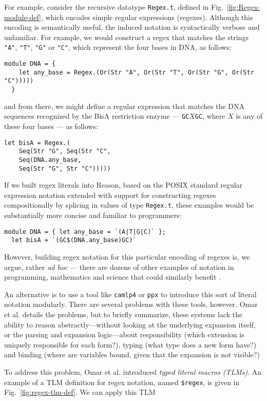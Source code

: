 \documentclass[acmsmall,review]{acmart}
\newcommand{\li}[1]{\lstinline[basicstyle=\ttfamily\fontsize{9pt}{1em}\selectfont]{#1}}
\theoremstyle{slplain}
\numberwithin{thm}{section}
\begin{document}
For example, consider the recursive datatype \li{Regex.t}, defined in Fig.~\ref{fig:Regex-module-def}, which encodes simple regular expressions (regexes). Although this encoding is semantically useful, the induced notation is syntactically verbose and unfamiliar. For example, we would construct a regex that matches the strings \li{"A"}, \li{"T"}, \li{"G"} or \li{"C"}, which represent the four bases in DNA, as follows:
\begin{lstlisting}[numbers=none]
  module DNA = { 
    let any_base = Regex.(Or(Str "A", Or(Str "T", Or(Str "G", Or(Str "C")))))
  }
\end{lstlisting}
and from there, we might define a regular expression that matches the DNA sequences recognized by the BisA restriction enzyme --- \li{GC}$X$\li{GC}, where $X$ is any of these four bases --- as follows:
\begin{lstlisting}[numbers=none]
  let bisA = Regex.(
    Seq(Str "G", Seq(Str "C", 
    Seq(DNA.any_base, 
    Seq(Str "G", Str "C")))))
\end{lstlisting}

If we built regex literals into Reason, based on the POSIX standard regular expression notation extended with support for constructing regexes compositionally by splicing in values of type \li{Regex.t}, these examples would be substantially more concise and familiar to programmers:
\begin{lstlisting}[numbers=none]
  module DNA = { let any_base = `(A|T|G|C)` };
  let bisA = `(GC$(DNA.any_base)GC)`
\end{lstlisting}

However, building regex notation for this particular encoding of regexes is, we argue, rather \emph{ad hoc} --- there are dozens of other examples of notation in programming, mathematics and science that could similarly benefit \cite{cites,from,paper}. 

An alternative is to use a tool like \li{camlp4} or \li{ppx} to introduce this sort of literal notation modularly. There are several problems with these tools, however. Omar et al. \cite{TLMs-paper} details the problems, but to briefly summarize, these systems lack the ability to reason abstractly---without looking at the underlying expansion itself, or the parsing and expansion logic---about responsibility (which extension is uniquely responsible for each form?), typing (what type does a new form have?) and binding (where are variables bound, given that the expansion is not visible?)

To address this problem, Omar et al. \cite{TLMs-paper} introduced \emph{typed literal macros (TLMs)}. An example of a TLM definition for regex notation, named \li{$regex}, is given in Fig.~\ref{fig:regex-tlm-def}. We can apply this TLM  
\end{document}
